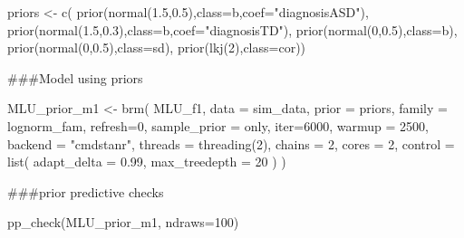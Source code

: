 \documentclass[
]{article}
\newenvironment{Shaded}{\begin{snugshade}}{\end{snugshade}}
\newcommand{\AttributeTok}[1]{\textcolor[rgb]{0.77,0.63,0.00}{#1}}
\newcommand{\DecValTok}[1]{\textcolor[rgb]{0.00,0.00,0.81}{#1}}
\newcommand{\FloatTok}[1]{\textcolor[rgb]{0.00,0.00,0.81}{#1}}
\newcommand{\FunctionTok}[1]{\textcolor[rgb]{0.00,0.00,0.00}{#1}}
\newcommand{\NormalTok}[1]{#1}
\newcommand{\OtherTok}[1]{\textcolor[rgb]{0.56,0.35,0.01}{#1}}
\newcommand{\StringTok}[1]{\textcolor[rgb]{0.31,0.60,0.02}{#1}}
\begin{document}
\begin{Shaded}
\begin{Highlighting}[]
\NormalTok{priors }\OtherTok{\textless{}{-}} \FunctionTok{c}\NormalTok{(}
\FunctionTok{prior}\NormalTok{(}\FunctionTok{normal}\NormalTok{(}\FloatTok{1.5}\NormalTok{,}\FloatTok{0.5}\NormalTok{),}\AttributeTok{class=}\NormalTok{b,}\AttributeTok{coef=}\StringTok{"diagnosisASD"}\NormalTok{),}
\FunctionTok{prior}\NormalTok{(}\FunctionTok{normal}\NormalTok{(}\FloatTok{1.5}\NormalTok{,}\FloatTok{0.3}\NormalTok{),}\AttributeTok{class=}\NormalTok{b,}\AttributeTok{coef=}\StringTok{"diagnosisTD"}\NormalTok{),}
\FunctionTok{prior}\NormalTok{(}\FunctionTok{normal}\NormalTok{(}\DecValTok{0}\NormalTok{,}\FloatTok{0.5}\NormalTok{),}\AttributeTok{class=}\NormalTok{b),}
\FunctionTok{prior}\NormalTok{(}\FunctionTok{normal}\NormalTok{(}\DecValTok{0}\NormalTok{,}\FloatTok{0.5}\NormalTok{),}\AttributeTok{class=}\NormalTok{sd),}
\FunctionTok{prior}\NormalTok{(}\FunctionTok{lkj}\NormalTok{(}\DecValTok{2}\NormalTok{),}\AttributeTok{class=}\NormalTok{cor))}
\end{Highlighting}
\end{Shaded}

\#\#\#Model using priors

\begin{Shaded}
\begin{Highlighting}[]
\NormalTok{MLU\_prior\_m1 }\OtherTok{\textless{}{-}} \FunctionTok{brm}\NormalTok{(}
\NormalTok{  MLU\_f1, }
  \AttributeTok{data =}\NormalTok{ sim\_data, }
  \AttributeTok{prior =}\NormalTok{ priors,}
  \AttributeTok{family =}\NormalTok{ lognorm\_fam,}
  \AttributeTok{refresh=}\DecValTok{0}\NormalTok{,}
  \AttributeTok{sample\_prior =} \StringTok{\textquotesingle{}only\textquotesingle{}}\NormalTok{,}
  \AttributeTok{iter=}\DecValTok{6000}\NormalTok{,}
  \AttributeTok{warmup =} \DecValTok{2500}\NormalTok{,}
  \AttributeTok{backend =} \StringTok{"cmdstanr"}\NormalTok{,}
  \AttributeTok{threads =} \FunctionTok{threading}\NormalTok{(}\DecValTok{2}\NormalTok{),}
  \AttributeTok{chains =} \DecValTok{2}\NormalTok{,}
  \AttributeTok{cores =} \DecValTok{2}\NormalTok{,}
  \AttributeTok{control =} \FunctionTok{list}\NormalTok{(}
    \AttributeTok{adapt\_delta =} \FloatTok{0.99}\NormalTok{,}
    \AttributeTok{max\_treedepth =} \DecValTok{20}
\NormalTok{)}
\NormalTok{)}
\end{Highlighting}
\end{Shaded}

\#\#\#prior predictive checks

\begin{Shaded}
\begin{Highlighting}[]
\FunctionTok{pp\_check}\NormalTok{(MLU\_prior\_m1, }\AttributeTok{ndraws=}\DecValTok{100}\NormalTok{)}
\end{Highlighting}
\end{Shaded}
\end{document}
